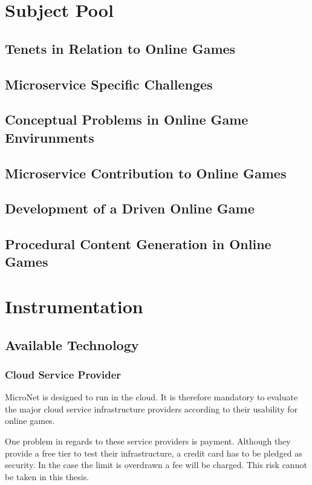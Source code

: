 \section{Subject Pool}

\subsection{\ms{} Tenets in Relation to Online Games}

\subsection{Microservice Specific Challenges}
\subsection{Conceptual Problems in \ms{} Online Game Envirunments}
\subsection{Microservice Contribution to Online Games}
\subsection{Development of a \ms{} Driven Online Game}
\subsection{Procedural Content Generation in Online Games}

\section{Instrumentation}
\subsection{Available Technology}

\subsubsection{Cloud Service Provider}

MicroNet is designed to run in the cloud. It is therefore mandatory to evaluate
the major cloud service infrastructure providers according to their usability
for online games.

One problem in regards to these service providers is payment. Although they
provide a free tier to test their infrastructure, a credit card has to be
pledged as security. In the case the limit is overdrawn a fee will be charged.
This risk cannot be taken in this thesis. 

